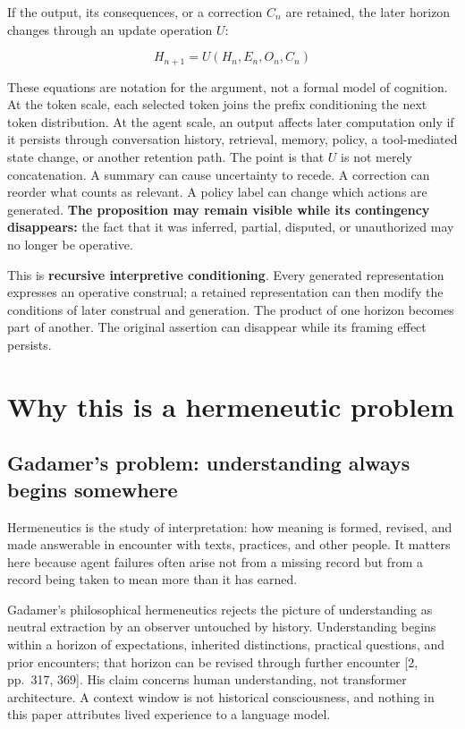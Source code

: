 \documentclass[12pt]{article}
\begin{document}
If the output, its consequences, or a correction \(C_n\) are retained, the later horizon changes through an update operation \(U\):

\[
H_{n+1} = U(H_n, E_n, O_n, C_n)
\]

These equations are notation for the argument, not a formal model of cognition. At the token scale, each selected token joins the prefix conditioning the next token distribution. At the agent scale, an output affects later computation only if it persists through conversation history, retrieval, memory, policy, a tool-mediated state change, or another retention path. The point is that \(U\) is not merely concatenation. A summary can cause uncertainty to recede. A correction can reorder what counts as relevant. A policy label can change which actions are generated. \textbf{The proposition may remain visible while its contingency disappears:} the fact that it was inferred, partial, disputed, or unauthorized may no longer be operative.

This is \textbf{recursive interpretive conditioning}. Every generated representation expresses an operative construal; a retained representation can then modify the conditions of later construal and generation. The product of one horizon becomes part of another. The original assertion can disappear while its framing effect persists.

\section{Why this is a hermeneutic problem}\label{why-this-is-a-hermeneutic-problem}

\subsection{Gadamer's problem: understanding always begins somewhere}\label{gadamers-problem-understanding-always-begins-somewhere}

Hermeneutics is the study of interpretation: how meaning is formed, revised, and made answerable in encounter with texts, practices, and other people. It matters here because agent failures often arise not from a missing record but from a record being taken to mean more than it has earned.

Gadamer's philosophical hermeneutics rejects the picture of understanding as neutral extraction by an observer untouched by history. Understanding begins within a horizon of expectations, inherited distinctions, practical questions, and prior encounters; that horizon can be revised through further encounter {[}2, pp.~317, 369{]}. His claim concerns human understanding, not transformer architecture. A context window is not historical consciousness, and nothing in this paper attributes lived experience to a language model.
\end{document}

